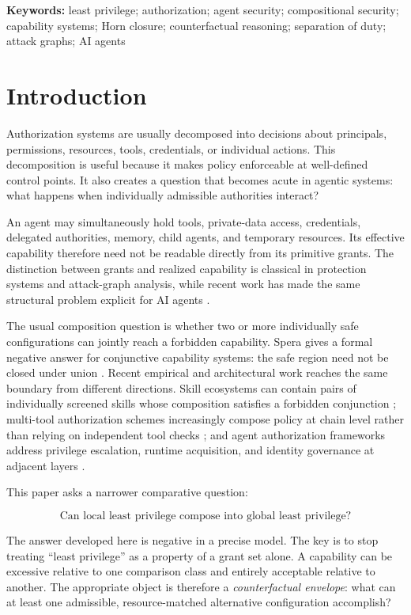 \documentclass[11pt]{article}
\begin{document}
\textbf{Keywords:} least privilege; authorization; agent security; compositional security; capability systems; Horn closure; counterfactual reasoning; separation of duty; attack graphs; AI agents

\section{Introduction}

Authorization systems are usually decomposed into decisions about principals, permissions, resources, tools, credentials, or individual actions. This decomposition is useful because it makes policy enforceable at well-defined control points. It also creates a question that becomes acute in agentic systems: what happens when individually admissible authorities interact?

An agent may simultaneously hold tools, private-data access, credentials, delegated authorities, memory, child agents, and temporary resources. Its effective capability therefore need not be readable directly from its primitive grants. The distinction between grants and realized capability is classical in protection systems and attack-graph analysis, while recent work has made the same structural problem explicit for AI agents \cite{harrison1976, sheyner2002, ou2005,spera2026,campbell2026}.

The usual composition question is whether two or more individually safe configurations can jointly reach a forbidden capability. Spera gives a formal negative answer for conjunctive capability systems: the safe region need not be closed under union \cite{spera2026}. Recent empirical and architectural work reaches the same boundary from different directions. Skill ecosystems can contain pairs of individually screened skills whose composition satisfies a forbidden conjunction \cite{wang2026}; multi-tool authorization schemes increasingly compose policy at chain level rather than relying on independent tool checks \cite{schneider2026}; and agent authorization frameworks address privilege escalation, runtime acquisition, and identity governance at adjacent layers \cite{ji2026,yang2026,zhu2026,booth2026}.

This paper asks a narrower comparative question:

\[
\boxed{\text{Can local least privilege compose into global least privilege?}}
\]

The answer developed here is negative in a precise model. The key is to stop treating ``least privilege'' as a property of a grant set alone. A capability can be excessive relative to one comparison class and entirely acceptable relative to another. The appropriate object is therefore a \emph{counterfactual envelope}: what can at least one admissible, resource-matched alternative configuration accomplish?
\end{document}
